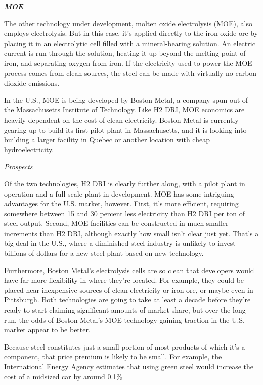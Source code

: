 \documentclass[
]{book}
\begin{document}
\textbf{\emph{MOE}}

The other technology under development, molten oxide electrolysis (MOE), also employs electrolysis. But in this case, it's applied directly to the iron oxide ore by placing it in an electrolytic cell filled with a mineral-bearing solution. An electric current is run through the solution, heating it up beyond the melting point of iron, and separating oxygen from iron. If the electricity used to power the MOE process comes from clean sources, the steel can be made with virtually no carbon dioxide emissions.

In the U.S., MOE is being developed by Boston Metal, a company spun out of the Massachusetts Institute of Technology. Like H2 DRI, MOE economics are heavily dependent on the cost of clean electricity. Boston Metal is currently gearing up to build its first pilot plant in Massachusetts, and it is looking into building a larger facility in Quebec or another location with cheap hydroelectricity.

\emph{Prospects}

Of the two technologies, H2 DRI is clearly further along, with a pilot plant in operation and a full-scale plant in development. MOE has some intriguing advantages for the U.S. market, however. First, it's more efficient, requiring somewhere between 15 and 30 percent less electricity than H2 DRI per ton of steel output. Second, MOE facilities can be constructed in much smaller increments than H2 DRI, although exactly how small isn't clear just yet. That's a big deal in the U.S., where a diminished steel industry is unlikely to invest billions of dollars for a new steel plant based on new technology.

Furthermore, Boston Metal's electrolysis cells are so clean that developers would have far more flexibility in where they're located. For example, they could be placed near inexpensive sources of clean electricity or iron ore, or maybe even in Pittsburgh. Both technologies are going to take at least a decade before they're ready to start claiming significant amounts of market share, but over the long run, the odds of Boston Metal's MOE technology gaining traction in the U.S. market appear to be better.

Because steel constitutes just a small portion of most products of which it's a component, that price premium is likely to be small. For example, the International Energy Agency estimates that using green steel would increase the cost of a midsized car by around 0.1\%
\end{document}
